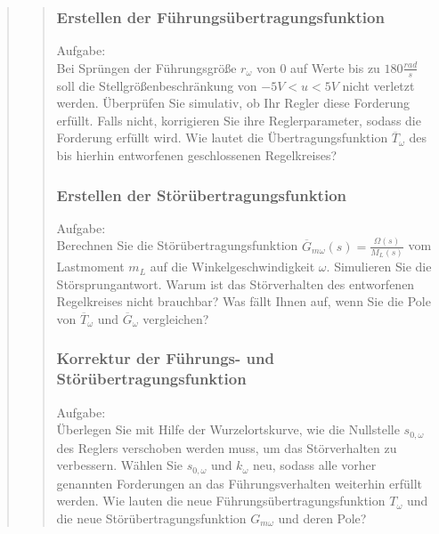 \begin{quote}
\begin{quote}
\begin{quote}
		\end{quote}
        
        \subsubsection{Erstellen der Führungsübertragungsfunktion}
        Aufgabe:\\
        Bei Sprüngen der Führungsgröße $r_\omega$ von $0$ auf Werte bis zu $180 \frac{rad}{s}$ soll die
        Stellgrößenbeschränkung von $−5V < u < 5V$ nicht verletzt werden. Überprüfen Sie simulativ, ob Ihr Regler
        diese Forderung erfüllt. Falls nicht, korrigieren Sie ihre Reglerparameter, sodass die Forderung erfüllt wird.
        Wie lautet die Übertragungsfunktion $\overline{T}_\omega$ des bis hierhin entworfenen geschlossenen
        Regelkreises?
        \begin{quote}
            
        \end{quote}
        
        \subsubsection{Erstellen der Störübertragungsfunktion}
        Aufgabe:\\
        Berechnen Sie die Störübertragungsfunktion $\overline{G}_{m\omega} (s) = \frac{\Omega(s)}{M_L (s)}$ vom
        Lastmoment $m_L$ auf die Winkelgeschwindigkeit $\omega$. Simulieren Sie die Störsprungantwort. Warum ist das
        Störverhalten des entworfenen Regelkreises nicht brauchbar? Was fällt Ihnen auf, wenn Sie die Pole von
        $\overline{T}_\omega$ und $\overline{G}_\omega$ vergleichen?
		\begin{quote}
			
		\end{quote}
		
		\subsubsection{Korrektur der Führungs- und Störübertragungsfunktion}
		Aufgabe:\\
	    Überlegen Sie mit Hilfe der Wurzelortskurve, wie die Nullstelle $s_{0,ω}$ des Reglers verschoben werden muss, um
	    das Störverhalten zu verbessern. Wählen Sie $s_{0,ω}$ und $k_\omega$ neu, sodass alle vorher genannten
	    Forderungen an das Führungsverhalten weiterhin erfüllt werden. Wie lauten die neue
	    Führungsübertragungsfunktion $T_\omega$ und die neue Störübertragungsfunktion $G_{m\omega}$ und deren Pole?
		\begin{quote}
			

\end{quote}
\end{quote}
\end{quote}
